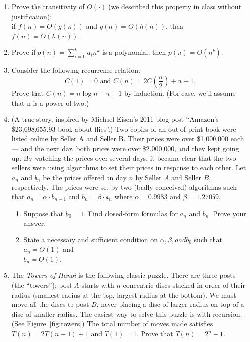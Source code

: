 \documentclass[11pt, oneside]{article}   	%
\begin{document}
\begin{enumerate}
\item Prove the transitivity of $O(\cdot)$ (we described this property in class without justification): \\
if $f(n)=O(g(n))$ and $g(n)=O(h(n))$, then $f(n)=O(h(n))$.
\item Prove if $p(n) = \sum_{i=0}^{k} a_i n^k$ is a polynomial, then $p(n) = O(n^k)$.

\item Consider the following recurrence relation: 
\[
C(1) = 0 \text{   and  } C(n) = 2C\left( \frac{n}{2} \right) + n - 1.
\]
Prove that $C(n) = n \log n - n + 1$ by induction. 
(For ease, we’ll assume that n is a power
of two.)

\item (A true story, inspired by Michael Eisen’s 2011 blog post ``Amazon’s \$23,698,655.93 book about flies''.) 
Two copies of an out-of-print book were listed online by Seller A and Seller B. Their prices were over \$1,000,000 each --- 
and the next day, both prices were over \$2,000,000, and they kept going up. 
By watching the prices over several days, it became clear that the two sellers were using algorithms to set their prices in response to each other. 
Let $a_n$ and $b_n$ be the prices offered on day $n$ by Seller $A$ and Seller $B$, respectively. 
The prices were set by two (badly conceived) algorithms such that $a_n = \alpha \cdot b_{n-1}$ and $b_n = \beta \cdot a_n$ where $\alpha = 0.9983$ and $\beta = 1.27059$.
\begin{enumerate}
\item Suppose that $b_0 = 1$. Find closed-form formulas for $a_n$ and $b_n$. Prove your answer.
\item State a necessary and sufficient condition on $\alpha, \beta, and b_0$ such that $a_n = \Theta(1)$ and \\$b_n = \Theta(1)$.
\end{enumerate}

\item 
\label{q:towers}
The \emph{Towers of Hanoi} is the following classic puzzle. 
There are three posts (the ``towers''); 
post $A$ starts with $n$ concentric discs stacked in order of their radius (smallest radius at the top, largest radius at the bottom). 
We must move all the discs to post $B$, never placing a disc of larger radius on top of a disc of smaller radius. 
The easiest way to solve this puzzle is with recursion. 
(See Figure~\ref{fig:towers}) 
The total number of moves made satisfies $T(n) = 2T(n-1) + 1$ and $T(1) = 1$. 
Prove that $T(n) = 2^n - 1$.


\end{enumerate}
\end{document}
